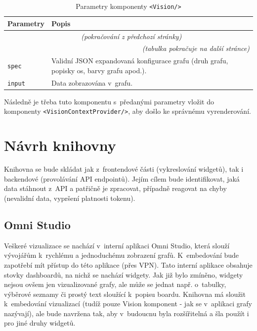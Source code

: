 \documentclass[czech, bc, kiv, he, iso690numb, viewonly]{fasthesis} %
\begin{document}
	\begin{longtable}{p{}p{}}
	\caption{Parametry komponenty \texttt{<Vision/>}}
	\label{tab:visionParams}\\
	\toprule[1.5pt]
	\textbf{Parametry} & \textbf{Popis}\\
	\midrule
	\endfirsthead
	\multicolumn{2}{c}{\tablename{}~\thetable{} \textit{(pokračování z předchozí stránky)}}\\
	\endhead
	\midrule
	\multicolumn{2}{r}{\textit{(tabulka pokračuje na další stránce)}}\\
	\endfoot
	\bottomrule[1.5pt]
	\endlastfoot
	\verb"spec" & Validní JSON expandovaná konfigurace grafu (druh grafu, popisky os, barvy grafu apod.). \\
	\midrule
	\verb"input" &  Data zobrazována v~grafu. \\
	\end{longtable}

Následně je třeba tuto komponentu s~předanými parametry vložit do komponenty \texttt{<VisionContextProvider/>}, aby došlo ke správnému vyrenderování.

\section{Návrh knihovny}

Knihovna se bude skládat jak z~frontendové části (vykreslování widgetů), tak i backendové (provolávání API endpointů). Jejím cílem bude identifikovat, jaká data stáhnout z~API a patřičně je zpracovat, případně reagovat na chyby (nevalidní data, vypršení platnosti tokenu).
\subsection{Omni Studio}
Veškeré vizualizace se nachází v~interní aplikaci Omni Studio, která slouží vývojářům k~rychlému a jednoduchému zobrazení grafů. K~embedování bude zapotřebí mít přístup do této aplikace (přes VPN). Tato interní aplikace
obsahuje stovky dashboardů, na nichž se nachází widgety. Jak již bylo zmíněno, widgety nejsou ovšem jen vizualizované grafy, ale může se jednat např. o~tabulky, výběrové seznamy či prostý text sloužící k~popisu boardu.
Knihovna má sloužit k~embedování vizualizací (tudíž pouze Vision komponent - jak se v~aplikaci grafy nazývají), ale bude navržena tak, aby v~budoucnu byla rozšířitelná a šla použít i pro jiné druhy widgetů.
\end{document}
